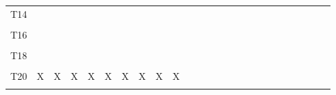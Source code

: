 \documentclass[
]{article}
\begin{document}
\begin{longtable}[l]{lllllllllllllllllllllllll}
T14 &  &  &  &  &  &  &  &  &  &  &  &  &  &  &  &  &  &  &  &  &  &  &  & \\
\cellcolor{gray!6}{T15} & \cellcolor{gray!6}{} & \cellcolor{gray!6}{} & \cellcolor{gray!6}{} & \cellcolor{gray!6}{} & \cellcolor{gray!6}{} & \cellcolor{gray!6}{} & \cellcolor{gray!6}{} & \cellcolor{gray!6}{} & \cellcolor{gray!6}{} & \cellcolor{gray!6}{} & \cellcolor{gray!6}{} & \cellcolor{gray!6}{} & \cellcolor{gray!6}{} & \cellcolor{gray!6}{} & \cellcolor{gray!6}{} & \cellcolor{gray!6}{} & \cellcolor{gray!6}{} & \cellcolor{gray!6}{} & \cellcolor{gray!6}{} & \cellcolor{gray!6}{} & \cellcolor{gray!6}{} & \cellcolor{gray!6}{} & \cellcolor{gray!6}{} & \cellcolor{gray!6}{}\\
\addlinespace
T16 &  &  &  &  &  &  &  &  &  &  &  &  &  &  &  &  &  &  &  &  &  &  &  & \\
\cellcolor{gray!6}{T17} & \cellcolor{gray!6}{} & \cellcolor{gray!6}{} & \cellcolor{gray!6}{} & \cellcolor{gray!6}{} & \cellcolor{gray!6}{} & \cellcolor{gray!6}{} & \cellcolor{gray!6}{} & \cellcolor{gray!6}{} & \cellcolor{gray!6}{} & \cellcolor{gray!6}{} & \cellcolor{gray!6}{} & \cellcolor{gray!6}{} & \cellcolor{gray!6}{} & \cellcolor{gray!6}{} & \cellcolor{gray!6}{} & \cellcolor{gray!6}{} & \cellcolor{gray!6}{} & \cellcolor{gray!6}{} & \cellcolor{gray!6}{} & \cellcolor{gray!6}{} & \cellcolor{gray!6}{} & \cellcolor{gray!6}{} & \cellcolor{gray!6}{} & \cellcolor{gray!6}{}\\
T18 &  &  &  &  &  &  &  &  &  &  &  &  &  &  &  &  &  &  &  &  &  &  &  & \\
\cellcolor{gray!6}{T19} & \cellcolor{gray!6}{} & \cellcolor{gray!6}{} & \cellcolor{gray!6}{} & \cellcolor{gray!6}{} & \cellcolor{gray!6}{} & \cellcolor{gray!6}{} & \cellcolor{gray!6}{} & \cellcolor{gray!6}{} & \cellcolor{gray!6}{} & \cellcolor{gray!6}{} & \cellcolor{gray!6}{} & \cellcolor{gray!6}{} & \cellcolor{gray!6}{} & \cellcolor{gray!6}{} & \cellcolor{gray!6}{} & \cellcolor{gray!6}{} & \cellcolor{gray!6}{} & \cellcolor{gray!6}{} & \cellcolor{gray!6}{} & \cellcolor{gray!6}{} & \cellcolor{gray!6}{} & \cellcolor{gray!6}{} & \cellcolor{gray!6}{} & \cellcolor{gray!6}{}\\
T20 & X & X & X & X & X & X & X & X & X &  &  &  &  &  &  &  &  &  &  &  &  &  &  & \\
\addlinespace
\cellcolor{gray!6}{T21} & \cellcolor{gray!6}{} & \cellcolor{gray!6}{} & \cellcolor{gray!6}{} & \cellcolor{gray!6}{} & \cellcolor{gray!6}{} & \cellcolor{gray!6}{} & \cellcolor{gray!6}{} & \cellcolor{gray!6}{} & \cellcolor{gray!6}{} & \cellcolor{gray!6}{X} & \cellcolor{gray!6}{} & \cellcolor{gray!6}{} & \cellcolor{gray!6}{} & \cellcolor{gray!6}{} & \cellcolor{gray!6}{} & \cellcolor{gray!6}{} & \cellcolor{gray!6}{} & \cellcolor{gray!6}{} & \cellcolor{gray!6}{} & \cellcolor{gray!6}{} & \cellcolor{gray!6}{} & \cellcolor{gray!6}{} & \cellcolor{gray!6}{} & \cellcolor{gray!6}{}\\

\end{longtable}
\end{document}
